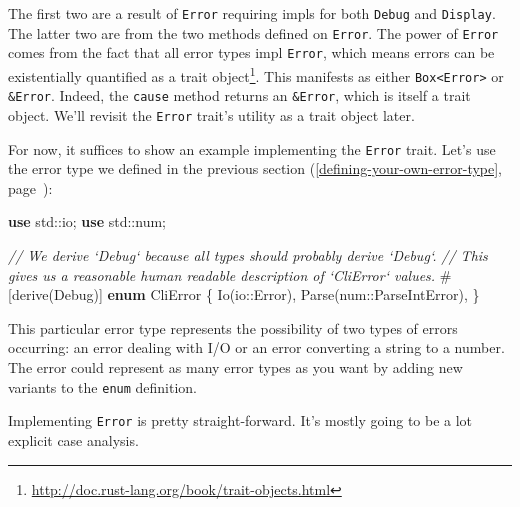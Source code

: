 \documentclass[a4paper,]{book}
\renewcommand*{\hyperref}[2][\ar]{%
  \def\ar{#2}%
  #2 (\autoref{#1}, page~\pageref{#1})}
\newenvironment{Shaded}{\begin{snugshade}}{\end{snugshade}}
\newcommand{\KeywordTok}[1]{\textcolor[rgb]{0.13,0.29,0.53}{\textbf{{#1}}}}
\newcommand{\CommentTok}[1]{\textcolor[rgb]{0.56,0.35,0.01}{\textit{{#1}}}}
\newcommand{\BuiltInTok}[1]{{#1}}
\newcommand{\AttributeTok}[1]{\textcolor[rgb]{0.77,0.63,0.00}{{#1}}}
\newcommand{\NormalTok}[1]{{#1}}
\renewcommand{\href}[2]{#2\footnote{\url{#1}}}
\begin{document}
The first two are a result of \texttt{Error} requiring impls for both
\texttt{Debug} and \texttt{Display}. The latter two are from the two
methods defined on \texttt{Error}. The power of \texttt{Error} comes
from the fact that all error types impl \texttt{Error}, which means
errors can be existentially quantified as a
\href{http://doc.rust-lang.org/book/trait-objects.html}{trait object}.
This manifests as either \texttt{Box\textless{}Error\textgreater{}} or
\texttt{\&Error}. Indeed, the \texttt{cause} method returns an
\texttt{\&Error}, which is itself a trait object. We'll revisit the
\texttt{Error} trait's utility as a trait object later.

For now, it suffices to show an example implementing the \texttt{Error}
trait. Let's use the error type we defined in the
\hyperref[defining-your-own-error-type]{previous section}:

\begin{Shaded}
\begin{Highlighting}[]
\KeywordTok{use} \NormalTok{std::io;}
\KeywordTok{use} \NormalTok{std::num;}

\CommentTok{// We derive `Debug` because all types should probably derive `Debug`.}
\CommentTok{// This gives us a reasonable human readable description of `CliError` values.}
\AttributeTok{#[}\NormalTok{derive}\AttributeTok{(}\BuiltInTok{Debug}\AttributeTok{)]}
\KeywordTok{enum} \NormalTok{CliError \{}
    \NormalTok{Io(io::Error),}
    \NormalTok{Parse(num::ParseIntError),}
\NormalTok{\}}
\end{Highlighting}
\end{Shaded}

This particular error type represents the possibility of two types of
errors occurring: an error dealing with I/O or an error converting a
string to a number. The error could represent as many error types as you
want by adding new variants to the \texttt{enum} definition.

Implementing \texttt{Error} is pretty straight-forward. It's mostly
going to be a lot explicit case analysis.
\end{document}
